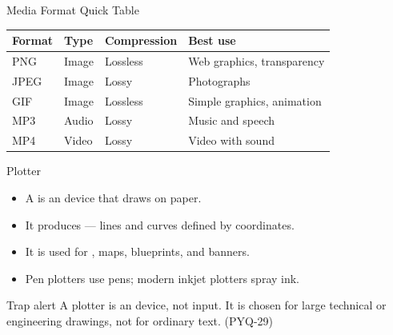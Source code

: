 \documentclass[aspectratio=169]{beamer}
\begin{document}
\begin{frame}{Media Format Quick Table}
  \begin{center}
    \begin{tabular}{p{}p{}p{}p{}}
      \toprule
      \textbf{Format} & \textbf{Type} & \textbf{Compression} & \textbf{Best use} \\
      \midrule
      PNG & Image & Lossless & Web graphics, transparency \\
      JPEG & Image & Lossy & Photographs \\
      GIF & Image & Lossless & Simple graphics, animation \\
      MP3 & Audio & Lossy & Music and speech \\
      MP4 & Video & Lossy & Video with sound \\
      \bottomrule
    \end{tabular}
  \end{center}
  \vspace{0.2cm}
\end{frame}

\begin{frame}{Plotter}
  \begin{itemize}
    \item A  is an  device that draws on paper.
    \item It produces  --- lines and curves defined by
      coordinates.
    \item It is used for , maps, blueprints,
      and banners.
    \item Pen plotters use pens; modern inkjet plotters spray ink.
  \end{itemize}
  \begin{alertblock}{Trap alert}
    A plotter is an  device, not input. It is chosen for large
    technical or engineering drawings, not for ordinary text. (PYQ-29)
  \end{alertblock}
\end{frame}
\end{document}
